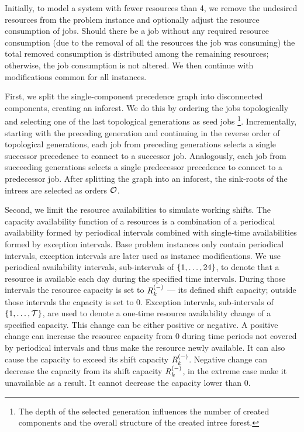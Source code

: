 Initially, to model a system with fewer resources than 4,
we remove the undesired resources from the problem instance
and optionally adjust the resource consumption of jobs.
Should there be a job without any required resource consumption
(due to the removal of all the resources the job was consuming)
the total removed consumption is distributed among the remaining resources;
otherwise, the job consumption is not altered.
We then continue with modifications common for all instances.

First, we split the single-component precedence graph into disconnected components,
creating an inforest.
We do this by ordering the jobs topologically
and selecting one of the last topological generations as seed jobs%
\footnote{The depth of the selected generation influences the number of created components
and the overall structure of the created intree forest.}.
Incrementally, starting with the preceding generation and continuing in the reverse order of topological generations,
each job from preceding generations selects a single successor precedence to connect to a successor job.
Analogously, each job from succeeding generations selects a single predecessor precedence to connect to a predecessor job.
After splitting the graph into an inforest, the sink-roots of the intrees are selected as orders $\mathcal{O}$.

Second, we limit the resource availabilities to simulate working shifts.
The capacity availability function of a resources is a combination of a periodical availability formed by periodical intervals
combined with single-time availabilities formed by exception intervals.
Base problem instances only contain periodical intervals,
exception intervals are later used as instance modifications.
We use periodical availability intervals, sub-intervals of $\{{1}, \dots, {24}\}$,
to denote that a resource is available each day during the specified time intervals.
During those intervals the resource capacity is set to $\shiftcapacity{k}$ --- its defined shift capacity;
outside those intervals the capacity is set to $0$.
Exception intervals, sub-intervals of $\{{1}, \dots, {\mathcal{T}}\}$, are used
to denote a one-time resource availability change of a specified capacity.
This change can be either positive or negative.
A positive change can increase the resource capacity from $0$ during time periods not covered by periodical intervals
and thus make the resource newly available.
It can also cause the capacity to exceed its shift capacity $\shiftcapacity{k}$.
Negative change can decrease the capacity from its shift capacity $\shiftcapacity{k}$,
in the extreme case make it unavailable as a result.
It cannot decrease the capacity lower than $0$.


